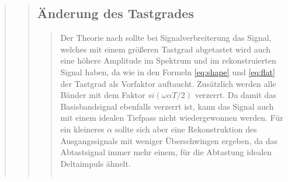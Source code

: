 \begin{quote}
\begin{quote}
\begin{quote}
          
            
          
        \end{quote}
        
        
        \subsection{Änderung des Tastgrades}
        \begin{quote}
             
             Der Theorie nach sollte bei Signalverbreiterung das Signal, welches mit einem größeren Tastgrad abgetastet
             wird auch eine höhere Amplitude im Spektrum und im rekonstruierten Signal haben, da wie in den Formeln \ref{eq:shape} und
             \ref{eq:flat} der Tastgrad als Vorfaktor auftaucht. Zusätzlich werden alle Bänder mit dem Faktor
             $si(\omega \alpha T/2)$ verzerrt. Da damit das Basisbandsignal ebenfalls verzerrt ist, kann das Signal auch mit einem idealen
             Tiefpass nicht wiedergewonnen werden. Für ein kleineres $\alpha$ sollte sich aber eine
             Rekonstruktion des Ausgangssignals mit weniger Überschwingen ergeben, da das Abtastsignal immer mehr einem,
             für die Abtastung idealen Deltaimpuls ähnelt.\\
             
              \begin{center}
            \begin{tabular}{ll}
            

\end{tabular}
\end{center}
\end{quote}
\end{quote}
\end{quote}
